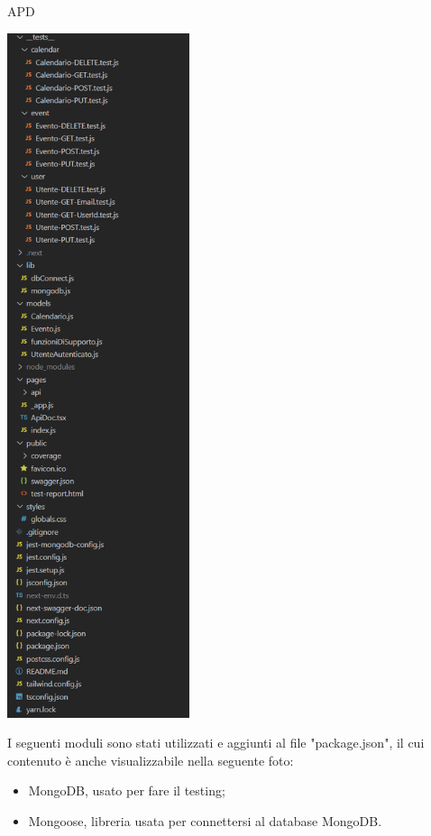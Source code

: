 \begin{listaPersonale} {APD}
\begin{center}
        \includegraphics[width=0.4\textwidth, height=0.9\textheight]{img/png/project_structure/project_structure_totale.png}
    \end{center}
    \newpage
    I seguenti moduli sono stati utilizzati e aggiunti al file "package.json", il cui contenuto è anche visualizzabile nella seguente foto:
    \begin{itemize}
        \item MongoDB, usato per fare il testing;
        \item Mongoose, libreria usata per connettersi al database MongoDB.

\end{itemize}
\end{listaPersonale}
